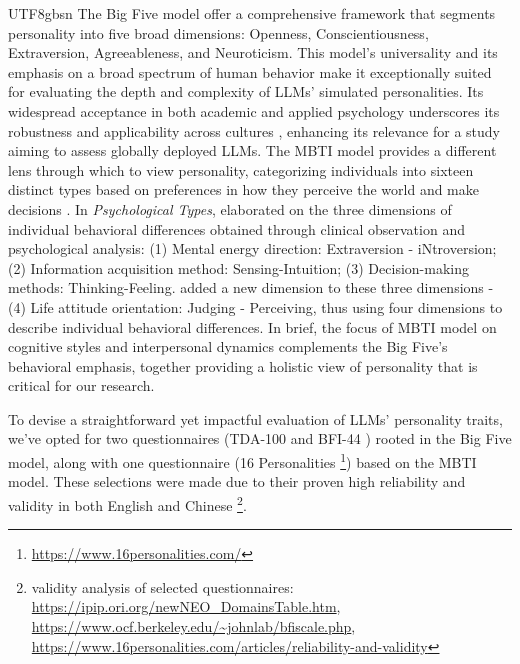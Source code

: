 \documentclass{article}
\theoremstyle{plain}
\theoremstyle{definition}
\theoremstyle{remark}
\begin{document}
\begin{CJK*}{UTF8}{gbsn}
The Big Five model \citep{goldberg1981language} offer a comprehensive framework that segments personality into five broad dimensions: Openness, Conscientiousness, Extraversion, Agreeableness, and Neuroticism. This model's universality and its emphasis on a broad spectrum of human behavior make it exceptionally suited for evaluating the depth and complexity of LLMs’ simulated personalities. Its widespread acceptance in both academic and applied psychology underscores its robustness and applicability across cultures \citep{john1988lexical}, enhancing its relevance for a study aiming to assess globally deployed LLMs. The MBTI model provides a different lens through which to view personality, categorizing individuals into sixteen distinct types based on preferences in how they perceive the world and make decisions \citep{myers1962myers}. In \textit{Psychological Types}, \citet{jung2016psychological} elaborated on the three dimensions of individual behavioral differences obtained through clinical observation and psychological analysis: (1) Mental energy direction:  Extraversion - iNtroversion; (2) Information acquisition method: Sensing-Intuition; (3) Decision-making methods: Thinking-Feeling. \citet{myers1962myers} added a new dimension to these three dimensions - (4) Life attitude orientation: Judging - Perceiving, thus using four dimensions to describe individual behavioral differences. In brief, the focus of MBTI model on cognitive styles and interpersonal dynamics complements the Big Five's behavioral emphasis, together providing a holistic view of personality that is critical for our research.

To devise a straightforward yet impactful evaluation of LLMs' personality traits, we've opted for two questionnaires (TDA-100 \citep{goldberg1992development} and BFI-44 \citep{john1991big}) rooted in the Big Five model, along with one questionnaire (16 Personalities \footnote{\url{https://www.16personalities.com/}}) based on the MBTI model. These selections were made due to their proven high reliability and validity in both English and Chinese \citep{goldberg1992development, john1991big, makwana2020confirmatory, zhang2012BFC} \footnote{validity analysis of selected questionnaires: \url{https://ipip.ori.org/newNEO_DomainsTable.htm},  \url{https://www.ocf.berkeley.edu/~johnlab/bfiscale.php}, \url{https://www.16personalities.com/articles/reliability-and-validity}}.


\end{CJK*}
\end{document}
